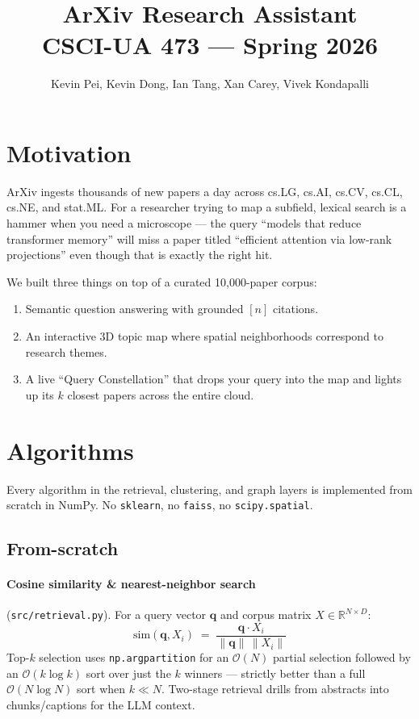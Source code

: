 \documentclass[11pt]{article}
\title{ArXiv Research Assistant \\ \large CSCI-UA 473 --- Spring 2026}
\author{Kevin Pei, Kevin Dong, Ian Tang, Xan Carey, Vivek Kondapalli}
\date{}
\begin{document}
\maketitle

\section{Motivation}

ArXiv ingests thousands of new papers a day across cs.LG, cs.AI, cs.CV, cs.CL, cs.NE, and stat.ML.
For a researcher trying to map a subfield, lexical search is a hammer when you need a microscope ---
the query ``models that reduce transformer memory'' will miss a paper titled
``efficient attention via low-rank projections'' even though that is exactly the right hit.

We built three things on top of a curated 10{,}000-paper corpus:

\begin{enumerate}[noitemsep]
    \item Semantic question answering with grounded $[n]$ citations.
    \item An interactive 3D topic map where spatial neighborhoods correspond to research themes.
    \item A live ``Query Constellation'' that drops your query into the map and lights up its
          $k$ closest papers across the entire cloud.
\end{enumerate}

\section{Algorithms}

Every algorithm in the retrieval, clustering, and graph layers is implemented from scratch in NumPy.
No \texttt{sklearn}, no \texttt{faiss}, no \texttt{scipy.spatial}.

\subsection*{From-scratch}

\paragraph{Cosine similarity \& nearest-neighbor search} (\texttt{src/retrieval.py}).
For a query vector $\mathbf{q}$ and corpus matrix $X \in \mathbb{R}^{N \times D}$:
\[
\mathrm{sim}(\mathbf{q}, X_i) \;=\; \frac{\mathbf{q} \cdot X_i}{\|\mathbf{q}\|\,\|X_i\|}
\]
Top-$k$ selection uses \texttt{np.argpartition} for an $\mathcal{O}(N)$ partial selection
followed by an $\mathcal{O}(k \log k)$ sort over just the $k$ winners --- strictly better than
a full $\mathcal{O}(N \log N)$ sort when $k \ll N$. Two-stage retrieval drills from abstracts
into chunks/captions for the LLM context.
\end{document}
